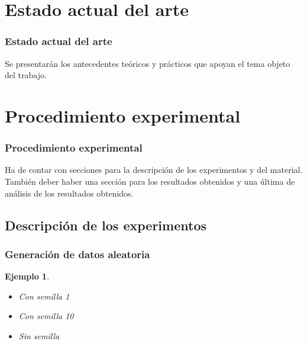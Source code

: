 \documentclass{beamer}
\newtheorem{ejemplo}{Ejemplo}
\begin{document}
\section{Estado actual del arte}

\begin{frame}
\frametitle{Estado actual del arte}

Se presentarán los antecedentes teóricos y prácticos que apoyan el tema objeto
del trabajo.

\end{frame}

\section{Procedimiento experimental}

\begin{frame}
\frametitle{Procedimiento experimental}

Ha de contar con secciones para la descripción de los experimentos y del material.
También deber haber una sección para los resultados obtenidos y una última de
análisis de los resultados obtenidos.

\end{frame}

\subsection{Descripción de los experimentos}

\begin{frame}
\frametitle{Generación de datos aleatoria}

\begin{ejemplo}
  \begin{itemize}
    \item <1-> Con semilla 1 
    \item <2-> Con semilla 10 
    \item <3> Sin semilla 
  \end{itemize}
\end{ejemplo}

\end{frame}
\end{document}

